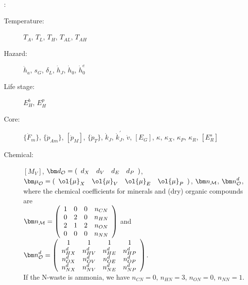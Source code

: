\vspace{5mm}: {\small
\begin{description}
  \item[Temperature: ] $T_A$, $T_L$, $T_H$, $T_{AL}$, $T_{AH}$ 
	
	\item[Hazard: ] $\ddot{h}_a$, $s_G$, $\delta_L$, $\dot{h}_J$, $\dot{h}_0$, $\dot{h}_0^e$
	
	\item[Life stage: ] $E_H^b$, $E_H^p$
	
  \item[Core: ] $\{\dot{F}_m\}$, $\{\dot{p}_{Am}\}$, $[\dot{p}_M]$, $\{\dot{p}_T\}$, $\dot{k}_J$, $\dot{k}_J^\prime$, 
	  $\dot{v}$, $[E_G]$, $\kappa$, $\kappa_X$, $\kappa_P$, $\kappa_R$, $[E_R^s]$
		
  \item[Chemical: ] $[M_V]$, 
	  ${\bm d}_{\cal O} = (\begin{array}{cccc} d_X & d_V & d_E & d_P \end{array})$, 
	  ${\bm \mu}_{\cal O} = (\begin{array}{cccc} \ol{\mu}_X & \ol{\mu}_V & \ol{\mu}_E & \ol{\mu}_P\end{array})$,
	  ${\bm n}_{\cal M}$, ${\bm n}_{\cal O}^d$,\\
		  where the chemical coefficients for minerals and (dry) organic compounds are\\
	  ${\bm n}_{\cal M} = \left( 
      \begin{array}{cccc} 
        1 & 0 & 0 & n_{CN}\\ 
			  0 & 2 & 0 & n_{HN}\\ 
        2 & 1 & 2 & n_{ON}\\ 
			  0 & 0 & 0 & n_{NN} 
      \end{array} \right)$ and 
	  $ {\bm n}_{\cal O}^d = \left( 
    \begin{array}{cccc}
      1        & 1        & 1        & 1       \\ 
			n_{HX}^d & n_{HV}^d & n_{HE}^d & n_{HP}^d\\
      n_{OX}^d & n_{OV}^d & n_{OE}^d & n_{OP}^d\\ 
			n_{NX}^d & n_{NV}^d & n_{NE}^d & n_{NP}^d 
    \end{array} \right)$.\\ 
		If the N-waste is ammonia, we have $n_{CN} = 0$, $n_{HN} = 3$, $n_{ON} = 0$, $n_{NN} = 1$.
\end{description}}


